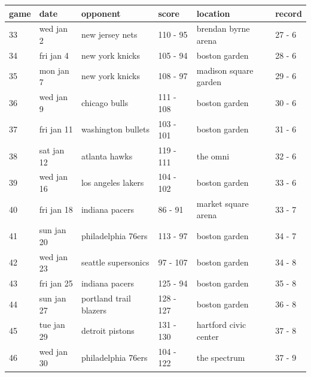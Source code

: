 \documentclass{article}
\begin{document}
\begin{tabular}{llllll}
\toprule
game & date & opponent & score & location & record \\
\midrule
33 & wed jan 2 & new jersey nets & 110 - 95 & brendan byrne arena & 27 - 6 \\
34 & fri jan 4 & new york knicks & 105 - 94 & boston garden & 28 - 6 \\
35 & mon jan 7 & new york knicks & 108 - 97 & madison square garden & 29 - 6 \\
36 & wed jan 9 & chicago bulls & 111 - 108 & boston garden & 30 - 6 \\
37 & fri jan 11 & washington bullets & 103 - 101 & boston garden & 31 - 6 \\
38 & sat jan 12 & atlanta hawks & 119 - 111 & the omni & 32 - 6 \\
39 & wed jan 16 & los angeles lakers & 104 - 102 & boston garden & 33 - 6 \\
40 & fri jan 18 & indiana pacers & 86 - 91 & market square arena & 33 - 7 \\
41 & sun jan 20 & philadelphia 76ers & 113 - 97 & boston garden & 34 - 7 \\
42 & wed jan 23 & seattle supersonics & 97 - 107 & boston garden & 34 - 8 \\
43 & fri jan 25 & indiana pacers & 125 - 94 & boston garden & 35 - 8 \\
44 & sun jan 27 & portland trail blazers & 128 - 127 & boston garden & 36 - 8 \\
45 & tue jan 29 & detroit pistons & 131 - 130 & hartford civic center & 37 - 8 \\
46 & wed jan 30 & philadelphia 76ers & 104 - 122 & the spectrum & 37 - 9 \\
\bottomrule
\end{tabular}
\end{document}
